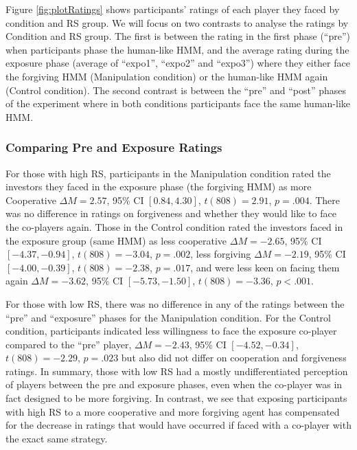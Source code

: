 \documentclass[
]{article}
\begin{document}
Figure \ref{fig:plotRatings} shows participants' ratings of each player they faced by condition and RS group. We will focus on two contrasts to analyse the ratings by Condition and RS group. The first is between the rating in the first phase (``pre'') when participants phase the human-like HMM, and the average rating during the exposure phase (average of ``expo1'', ``expo2'' and ``expo3'') where they either face the forgiving HMM (Manipulation condition) or the human-like HMM again (Control condition). The second contrast is between the ``pre'' and ``post'' phases of the experiment where in both conditions participants face the same human-like HMM.

\subsubsection{Comparing Pre and Exposure Ratings}\label{comparing-pre-and-exposure-ratings}

For those with high RS, participants in the Manipulation condition rated the investors they faced in the exposure phase (the forgiving HMM) as more Cooperative \(\Delta M = 2.57\), 95\% CI \([0.84, 4.30]\), \(t(808) = 2.91\), \(p = .004\). There was no difference in ratings on forgiveness and whether they would like to face the co-players again.
Those in the Control condition rated the investors faced in the exposure group (same HMM) as less cooperative \(\Delta M = -2.65\), 95\% CI \([-4.37, -0.94]\), \(t(808) = -3.04\), \(p = .002\), less forgiving \(\Delta M = -2.19\), 95\% CI \([-4.00, -0.39]\), \(t(808) = -2.38\), \(p = .017\), and were less keen on facing them again \(\Delta M = -3.62\), 95\% CI \([-5.73, -1.50]\), \(t(808) = -3.36\), \(p < .001\).

For those with low RS, there was no difference in any of the ratings between the ``pre'' and ``exposure'' phases for the Manipulation condition. For the Control condition, participants indicated less willingness to face the exposure co-player compared to the ``pre'' player, \(\Delta M = -2.43\), 95\% CI \([-4.52, -0.34]\), \(t(808) = -2.29\), \(p = .023\) but also did not differ on cooperation and forgiveness ratings. In summary, those with low RS had a mostly undifferentiated perception of players between the pre and exposure phases, even when the co-player was in fact designed to be more forgiving. In contrast, we see that exposing participants with high RS to a more cooperative and more forgiving agent has compensated for the decrease in ratings that would have occurred if faced with a co-player with the exact same strategy.
\end{document}
